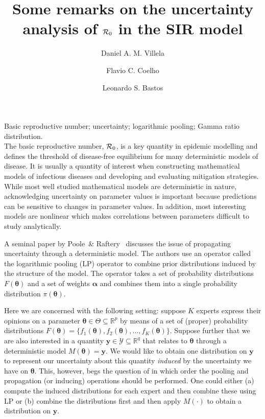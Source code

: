 \documentclass[11pt]{article}
\title{Some remarks on the uncertainty analysis of ${\cal R}_0$ in the SIR 
model}
\author[1]{Daniel A. M. Villela}
\author[2]{Flavio C. Coelho}
\author[1]{Leonardo S. Bastos}
\affil[2]{School of Applied Mathematics, Getulio Vargas Foundation (FGV), Brazil,\,\emailaddress{fccoelho@fgv.br}} %
\date{\vspace{-6ex}} %
\newcommand{\keywords}[1]{\noindent{\large{\bf Keywords:}} #1\\}
\begin{document}
\maketitle

\keywords{Basic reproductive number; uncertainty; logarithmic pooling; Gamma ratio distribution.}

The basic reproductive number, ${\cal R}_0$, is a key quantity in epidemic 
modelling and defines the threshold of disease-free equilibrium for many 
deterministic models of disease.
It is usually a quantity of interest when constructing mathematical models of infectious diseases and developing and evaluating mitigation strategies.
While most well studied mathematical models are deterministic in nature, acknowledging uncertainty on parameter values is important because predictions can be sensitive to changes in parameter values.
In addition, most interesting models are nonlinear which makes correlations between parameters difficult to study analytically.

A seminal paper by Poole~\& Raftery~\cite{poole2000} discusses the issue of propagating uncertainty through a deterministic model.
The authors use an operator called the logarithmic pooling (LP) operator to combine prior distributions induced by the structure of the model.
The operator takes a set of probability distributions $F(\boldsymbol\theta)$ and a set of weights $\boldsymbol\alpha$ and combines them into a single probability distribution $\pi(\boldsymbol\theta)$.

Here we are concerned with the following setting: suppose $K$ experts express their opinions on a parameter $\boldsymbol\theta \in \Theta \subseteq \mathbb{R}^{p}$ by means of a set of (proper) probability distributions $F(\boldsymbol\theta) = \{ f_1(\boldsymbol\theta), f_2(\boldsymbol\theta), \ldots, f_K(\boldsymbol\theta) \}$.
Suppose further that we are also interested in a quantity $\mathbf{y} \in  
\mathcal{Y}  \subseteq \mathbb{R}^{q}$ that relates to $\boldsymbol\theta $ 
through a deterministic model $M(\boldsymbol\theta) = \mathbf{y}$.
We would like to obtain one distribution on $\mathbf{y}$ to represent our uncertainty about this quantity \textit{induced} by the uncertainty we have on $\boldsymbol\theta$.
This, however, begs the question of in which order the pooling and propagation (or inducing) operations should be performed.
One could either (a) compute the induced distributions for each expert and then combine these using LP or (b) combine the distributions first and then apply $M(\cdot)$ to obtain a distribution on $\mathbf{y}$.
\end{document}
